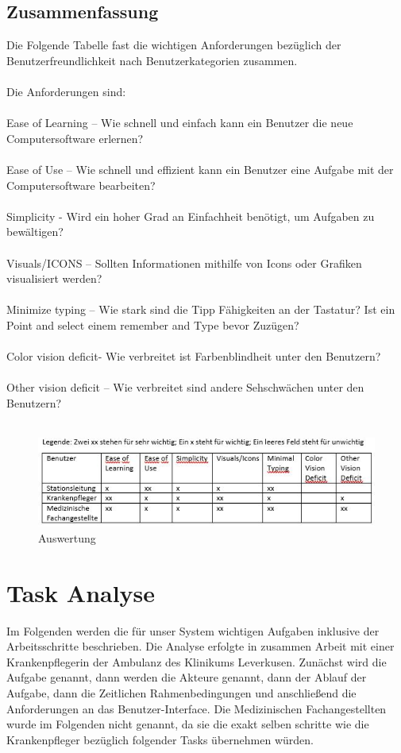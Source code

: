 \documentclass[11pt,
paper=a4,
bibtotocnumbered,	  %
liststotocnumbered,  %
DIV=calc,		  %
tablecaptionabove,	  %
headinclude,
]{article}
\begin{document}
\subsection{Zusammenfassung}
Die Folgende Tabelle fast die wichtigen Anforderungen bezüglich der Benutzerfreundlichkeit nach Benutzerkategorien zusammen.\\\\
Die Anforderungen sind:\\\\
Ease of Learning – Wie schnell und einfach kann ein Benutzer die neue Computersoftware erlernen?\\\\
Ease of Use – Wie schnell und effizient kann ein Benutzer eine Aufgabe mit der Computersoftware bearbeiten?\\\\
Simplicity - Wird ein hoher Grad an Einfachheit benötigt, um Aufgaben zu bewältigen?\\\\
Visuals/ICONS – Sollten Informationen mithilfe von Icons oder Grafiken visualisiert werden?\\\\
Minimize typing – Wie stark sind die Tipp Fähigkeiten an der Tastatur? Ist ein Point and select einem remember and Type bevor Zuzügen?\\\\
Color vision deficit- Wie verbreitet ist Farbenblindheit unter den Benutzern?\\\\
Other vision deficit – Wie verbreitet sind andere Sehschwächen unter den Benutzern?\\\\
\begin{figure}
\includegraphics[scale=1]{Bilder/tabelleAuswert.jpg}
\caption{Auswertung}
\end{figure}
\section{Task Analyse}
Im Folgenden werden die für unser System wichtigen Aufgaben inklusive der Arbeitsschritte beschrieben. Die Analyse erfolgte in zusammen Arbeit mit einer Krankenpflegerin der Ambulanz des Klinikums Leverkusen. Zunächst wird die Aufgabe genannt, dann werden die Akteure genannt, dann der Ablauf der Aufgabe, dann die Zeitlichen Rahmenbedingungen und anschließend die Anforderungen an das Benutzer-Interface. Die Medizinischen Fachangestellten wurde im Folgenden nicht genannt, da sie die exakt selben schritte wie die Krankenpfleger bezüglich folgender Tasks übernehmen würden.
\end{document}
